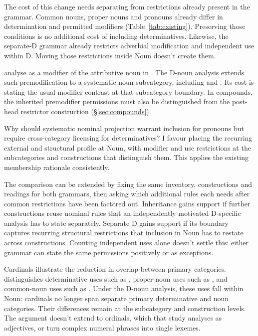 \documentclass[12pt]{article}
\begin{document}
The cost of this change needs separating from restrictions already present in the grammar. Common nouns, proper nouns and pronouns already differ in determination and permitted modifiers (Table~\ref{tab:existing}). Preserving those conditions is no additional cost of including determinatives. Likewise, the separate-D grammar already restricts adverbial modification and independent use within D. Moving those restrictions inside Noun doesn't create them.

\textcite[p.~75, n.~3]{payne2010} analyse  as a modifier of the attributive noun  in . The D-noun analysis extends such premodification to a systematic noun subcategory, including  and . Its cost is stating the usual modifier contrast at that subcategory boundary. In compounds, the inherited premodifier permissions must also be distinguished from the post-head restrictor construction (§\ref{sec:compounds}).

Why should systematic nominal projection warrant inclusion for pronouns but require cross-category licensing for determinatives? I favour placing the recurring external and structural profile at Noun, with modifier and use restrictions at the subcategories and constructions that distinguish them. This applies the existing membership rationale consistently.

The comparison can be extended by fixing the same inventory, constructions and readings for both grammars, then asking which additional rules each needs after common restrictions have been factored out. Inheritance gains support if further constructions reuse nominal rules that an independently motivated D-specific analysis has to state separately. Separate D gains support if its boundary captures recurring structural restrictions that inclusion in Noun has to restate across constructions. Counting independent uses alone doesn't settle this: either grammar can state the same permissions positively or as exceptions.

Cardinals illustrate the reduction in overlap between primary categories. \textcite{reynolds2026numerals} distinguishes determinative uses such as , proper-noun uses such as , and common-noun uses such as . Under the D-noun analysis, these uses fall within Noun: cardinals no longer span separate primary determinative and noun categories. Their differences remain at the subcategory and construction levels. The argument doesn't extend to ordinals, which that study analyses as adjectives, or turn complex numeral phrases into single lexemes.
\end{document}
